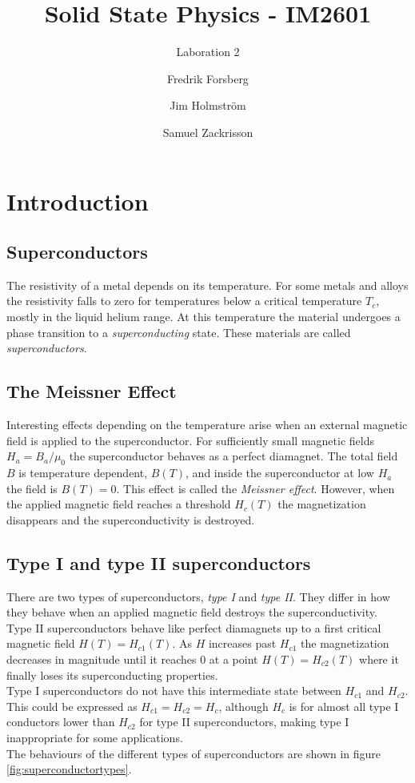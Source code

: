 \documentclass[a4paper,twoside=false,abstract=false,numbers=noenddot,
titlepage=false,headings=small,parskip=half,version=last]{scrartcl}
\title{Solid State Physics - IM2601}
\subtitle{Laboration 2}
\author[1]{Fredrik Forsberg}
\author[1]{Jim Holmström}
\author[1]{Samuel Zackrisson}
\affil[1]{Engineering Physics, Royal Institute of Technology}
\affil[1]{\{fforsber, jimho, samuelz\}@kth.se}
\begin{document}
\maketitle
\thispagestyle{empty}

\section{Introduction}
\subsection{Superconductors}
The resistivity of a metal depends on its temperature.
For some metals and alloys the resistivity falls to zero for temperatures below
a critical temperature $T_c$, mostly in the liquid helium range.
At this temperature the material undergoes a phase transition to a \emph{superconducting} state.
These materials are called \emph{superconductors}.

\subsection{The Meissner Effect}
Interesting effects depending on the temperature arise when an external
magnetic field is applied to the superconductor. For sufficiently small
magnetic fields $H_a=B_a / \mu_0$ the superconductor behaves as a perfect
diamagnet. The total field $B$ is temperature dependent, $B(T)$, and inside the
superconductor at low $H_a$ the field is $B(T)=0$. This effect is called the
\emph{Meissner effect}.
However, when the applied magnetic field reaches a threshold $H_c(T)$ the magnetization disappears
and the superconductivity is destroyed.

\subsection{Type I and type II superconductors}
There are two types of superconductors, \emph{type I} and \emph{type II}.
They differ in how they behave when an applied magnetic field destroys the superconductivity.\\
Type II superconductors behave like perfect diamagnets up to a first critical magnetic field $H(T)=H_{c1}(T)$.
As $H$ increases past $H_{c1}$ the magnetization decreases in magnitude until
it reaches $0$ at a point $H(T)=H_{c2}(T)$ where it finally loses its superconducting properties.\\
Type I superconductors do not have this intermediate state between $H_{c1}$ and $H_{c2}$.
This could be expressed as $H_{c1}=H_{c2}=H_c$, although $H_c$ is for almost all type I conductors lower than $H_{c2}$ for type II superconductors, making type I inappropriate for some applications.\\
The behaviours of the different types of superconductors are shown in figure \ref{fig:superconductortypes}.
\end{document}
